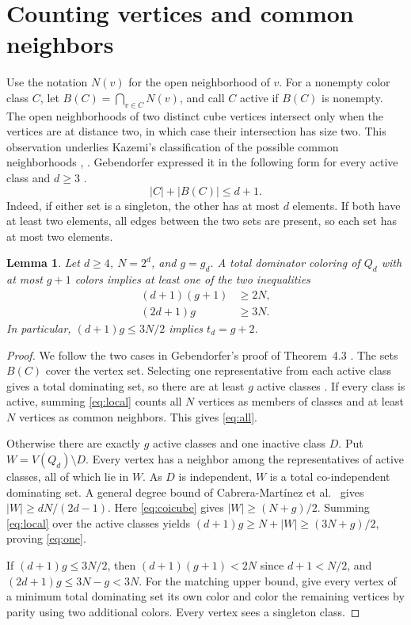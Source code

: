 \documentclass[11pt,a4paper]{article}
\newtheorem{lemma}[theorem]{Lemma}
\begin{document}
\section{Counting vertices and common neighbors}

Use the notation $N(v)$ for the open neighborhood of $v$. For a nonempty
color class $C$, let $B(C)=\bigcap_{v\in C}N(v)$, and call $C$ active
if $B(C)$ is nonempty. The open neighborhoods of two distinct cube
vertices intersect only when the vertices are at distance two, in which
case their intersection has size two. This observation underlies Kazemi's
classification of the possible common neighborhoods
\cite[proof of Proposition 4.2]{kazemi14}, \cite[Fact 5.1]{kazemi26}.
Gebendorfer expressed it in the following form for every active class and
$d\ge3$ \cite[Lemma 4.1]{geben}.
\begin{equation}\label{eq:local}
                   |C|+|B(C)|\le d+1.
\end{equation}
Indeed, if either set is a singleton, the other has at most $d$ elements.
If both have at least two elements, all edges between the two sets are
present, so each set has at most two elements.

\begin{lemma}\label{lem:count}
Let $d\ge4$, $N=2^d$, and $g=g_d$. A total dominator coloring of $Q_d$
with at most $g+1$ colors implies at least one of the two inequalities
\begin{align}
                  (d+1)(g+1)&\ge2N,\label{eq:all}\\
                       (2d+1)g&\ge3N.\label{eq:one}
\end{align}
In particular, $(d+1)g\le 3N/2$ implies $t_d=g+2$.
\end{lemma}

\begin{proof}
We follow the two cases in Gebendorfer's proof of Theorem~4.3
\cite{geben}. The sets $B(C)$ cover the vertex set. Selecting one
representative from each active class gives a total dominating set,
so there are at least $g$ active classes \cite[Lemma 4.2]{geben}. If every class is active, summing \eqref{eq:local}
counts all $N$ vertices as members of classes and at least $N$ vertices as
common neighbors. This gives \eqref{eq:all}.

Otherwise there are exactly $g$ active classes and one inactive class $D$.
Put $W=V(Q_d)\setminus D$. Every vertex has a neighbor among the
representatives of active classes, all of which lie in $W$. As $D$ is
independent, $W$ is a total co-independent dominating set. A general
degree bound of Cabrera-Mart\'inez et al.\ \cite[Theorem 8, $k=1$]{outer}
gives $|W|\ge dN/(2d-1)$. Here \eqref{eq:coicube} gives
$|W|\ge (N+g)/2$. Summing \eqref{eq:local} over the active classes
yields $(d+1)g\ge N+|W|\ge(3N+g)/2$, proving \eqref{eq:one}.

If $(d+1)g\le3N/2$, then $(d+1)(g+1)<2N$ since $d+1<N/2$,
and $(2d+1)g\le3N-g<3N$. For the matching upper bound,
give every vertex of a minimum total dominating set its own color and
color the remaining vertices by parity using two additional colors.
Every vertex sees a singleton class.
\end{proof}
\end{document}
